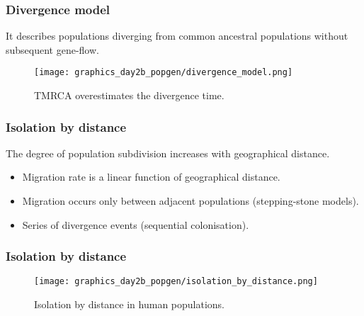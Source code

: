 \documentclass{beamer}
\newcommand{\1}{\ensuremath{\mathbf{1}}}
\begin{document}
%
%
%
\begin{frame}\frametitle{Divergence model}
	\begin{block}{}
		It describes populations diverging from common ancestral populations without subsequent gene-flow.
	\end{block}
	\begin{figure}
	\begin{center}
		\texttt{[image: graphics\_day2b\_popgen/divergence\_model.png]}
	\end{center}
	\caption{TMRCA overestimates the divergence time.}
	\end{figure}
\end{frame}
%
%
%
\begin{frame}\frametitle{Isolation by distance}
	\begin{block}{}
		The degree of population subdivision increases with geographical distance.
	\end{block}
	\begin{itemize}
		\item Migration rate is a linear function of geographical distance.
		\item Migration occurs only between adjacent populations (stepping-stone models).
		\item Series of divergence events (sequential colonisation).
	\end{itemize}
\end{frame}
%
%
%
\begin{frame}\frametitle{Isolation by distance}
	\begin{figure}
	\begin{center}
		\texttt{[image: graphics\_day2b\_popgen/isolation\_by\_distance.png]}
	\end{center}
	\caption{Isolation by distance in human populations.}
	\end{figure}
\end{frame}
\end{document}
